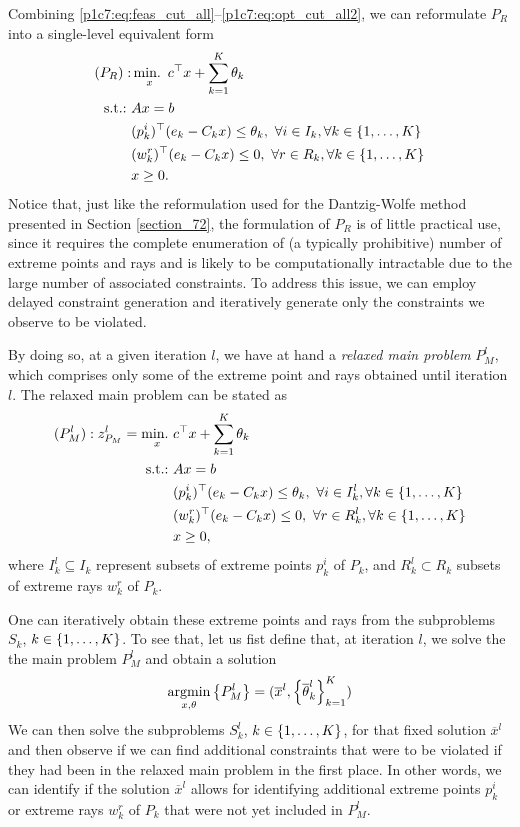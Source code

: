 Combining \eqref{p1c7:eq:feas_cut_all}--\eqref{p1c7:eq:opt_cut_all2}, we can reformulate $P_R$ into a single-level equivalent form 
%
\begin{align}
	(P_R) : & \mathop{\text{min.~}}_x c^\top x + \sum_{k=1}^K\theta_k \nonumber\\
	\mathop{\text{s.t.:~}}   & Ax = b \nonumber \\
		  & (p^i_k)^\top (e_k - C_k x) \leq  \theta_k, \ \forall i \in I_k, \forall k \in \left\{ 1,\dots, K \right \}  \label{p1c7:eq:opt_cut} \\
		  & 	(w^r_k)^\top (e_k - C_k x) \leq 0, \ \forall r \in R_k, \forall k \in \left\{ 1, \dots, K \right \} \label{p1c7:eq:feas_cut} \\
	      & x \geq 0. \nonumber
\end{align}
%
Notice that, just like the reformulation used for the Dantzig-Wolfe method presented in Section \ref{section_72}, the formulation of $P_R$ is of little practical use, since it requires the complete enumeration of (a typically prohibitive) number of extreme points and rays and is likely to be computationally intractable due to the large number of associated constraints. To address this issue, we can employ delayed constraint generation and iteratively generate only the constraints we observe to be violated. 

By doing so, at a given iteration $l$, we have at hand a \emph{relaxed main problem} $P_M^l$, which comprises only some of the extreme point and rays obtained until iteration $l$. The relaxed main problem can be stated as
%
\begin{align*}
	(P^l_M) : z_{P_M}^l = \mathop{\text{min.~}}_x & c^\top x + \sum_{k=1}^K\theta_k \\
	\mathop{\text{s.t.:~}}   & Ax = b \nonumber \\
		  & (p^i_k)^\top (e_k - C_k x) \leq  \theta_k, \ \forall i \in I_k^l, \forall k \in \left\{ 1, \dots, K \right \}  \\
		  & (w^r_k)^\top (e_k - C_k x) \leq 0, \ \forall r \in R_k^l, \forall k \in \left\{ 1, \dots, K \right \}  \\
	      & x \geq 0, 
\end{align*}
%
where $I_k^l \subseteq I_k$ represent subsets of extreme points $p^i_k$ of $P_k$, and $R^l_k \subset R_k$ subsets of extreme rays $w^r_k$ of $P_k$.

One can iteratively obtain these extreme points and rays from the subproblems $S_k$, $k \in \left\{ 1, \dots, K \right \}$. To see that, let us fist define that, at iteration $l$, we solve the the main problem $P_M^l$ and obtain a solution
%
\begin{equation*}
	\mathop{\rm argmin}_{x, \theta} \left\{ P_M^l \right \} = (\overline{x}^l, \left\{ \overline{\theta}^l_k \right \}_{k=1}^K) 
\end{equation*}
%
We can then solve the subproblems $S_k^l$, $k \in \left\{ 1, \dots, K \right \}$, for that fixed solution $\overline{x}^l$ and then observe if we can find additional constraints that were to be violated if they had been in the relaxed main problem in the first place. In other words, we can identify if the solution $\overline{x}^l$ allows for identifying additional extreme points $p^i_k$ or extreme rays $w^r_k$ of $P_k$ that were not yet included in $P_M^l$.

